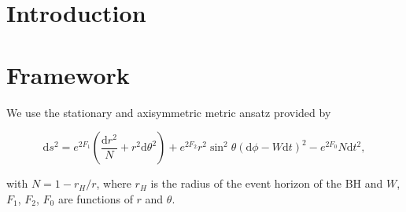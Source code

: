 \documentclass[twocolumn,aps,showpacs,showkeys,prd,superscriptaddress,byrevtex, amsmath]{revtex4-1}
\begin{document}

\section{Introduction}

\section{}

\section{Framework}




We use the stationary and axisymmetric metric ansatz provided by\cite{Herdeiro:2014a}

\begin{equation}
\mathrm{d}s^2 = e^{2F_1}\left(\frac{\mathrm{d}r^2}{N} + r^2\mathrm{d}\theta^2\right) + e^{2F_2}r^2\sin^2 \theta(\mathrm{d}\phi-W\mathrm{d}t)^2-e^{2F_0}N\mathrm{d}t^2,
\end{equation}

with $N = 1 - r_H/r$, where $r_H$ is the radius of the event horizon of the BH and $W$, $F_1$, $F_2$, $F_0$ are functions of $r$ and $\theta$.
\end{document}
